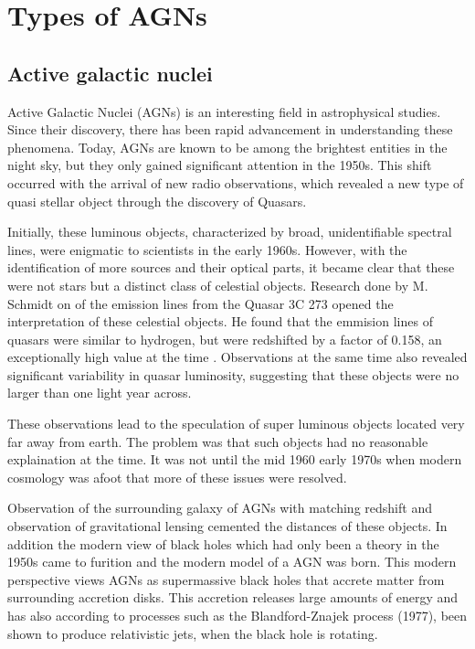 \documentclass{article}
\begin{document}
\section{Types of AGNs}

\subsection{Active galactic nuclei}




Active Galactic Nuclei (AGNs) is an interesting field in astrophysical studies. 
Since their discovery, there has been rapid advancement in understanding these phenomena.
Today, AGNs are known to be among the brightest entities in the night sky,
but they only gained significant attention in the 1950s. 
This shift occurred with the arrival of new radio observations, which revealed a new type of quasi stellar
object through the discovery of Quasars.

Initially, these luminous objects, characterized by broad, 
unidentifiable spectral lines, were enigmatic to scientists in the early 1960s. 
However, with the identification of more sources and their optical parts, 
it became clear that these were not stars but a distinct class of celestial objects. 
Research done by M. Schmidt on of the emission lines from 
the Quasar 3C 273 opened the interpretation of these celestial objects. 
He found that the emmision lines of quasars were similar to hydrogen, but were redshifted by a factor of 0.158,
an exceptionally high value at the time \cite{Shields_1999}. Observations at the same time also revealed significant 
variability in quasar luminosity, suggesting that these objects were no larger than one light year across. 

These observations lead to the speculation of super luminous objects located very far away from earth. The problem was that such objects
had no reasonable explaination at the time. It was not until the mid 1960 early 1970s when modern cosmology was 
afoot that more of these issues were resolved.

Observation of the surrounding galaxy of AGNs with matching redshift and observation of gravitational lensing cemented 
the distances of these objects. In addition the modern view of black holes which had only been a theory in the 1950s came to
furition and the modern model of a AGN was born. This modern perspective views AGNs as supermassive black holes that
accrete matter from surrounding accretion disks. This accretion releases large amounts of energy and has also according to 
processes such as  the Blandford-Znajek process (1977), been shown to produce relativistic jets, when the black hole is rotating.
\end{document}
